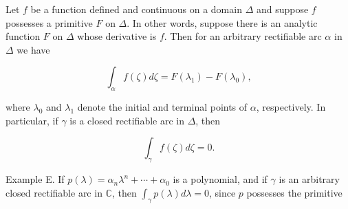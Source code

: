 Let $f$ be a function defined and continuous on a domain $\Delta$ and suppose $f$ possesses a primitive $F$ on $\Delta$. In other words, suppose there is an analytic function $F$ on $\Delta$ whose derivative is $f$. Then for an arbitrary rectifiable arc $\alpha$ in $\Delta$ we have

$$\int_{\alpha} f(\zeta) d\zeta = F(\lambda_1) - F(\lambda_0),$$

where $\lambda_0$ and $\lambda_1$ denote the initial and terminal points of $\alpha$, respectively. In particular, if $\gamma$ is a closed rectifiable arc in $\Delta$, then

$$\int_{\gamma} f(\zeta) d\zeta = 0.$$

Example E. If $p(\lambda) = \alpha_n \lambda^n + \cdots + \alpha_0$ is a polynomial, and if $\gamma$ is an arbitrary closed rectifiable arc in $\mathbb{C}$, then $\int_{\gamma} p(\lambda) d\lambda = 0$, since $p$ possesses the primitive

$$\
